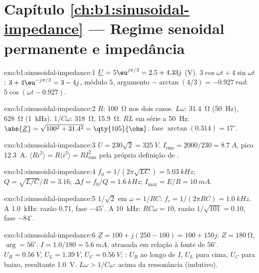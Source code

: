 \section*{Capítulo \ref{ch:b1:sinusoidal-impedance} --- Regime senoidal permanente e impedância}

\begin{solution}{exo:b1:sinusoidal-impedance:1}
$\underline U = 5\eu^{j\pi/3} = 2.5 + 4.33j$ (V). $3\cos\omega t +
4\sin\omega t$: $3 + 4\eu^{-j\pi/2} = 3 - 4j$, módulo $5$, argumento
$-\arctan(4/3) = \qty{-0.927}{rad}$: $5\cos(\omega t - 0.927)$.
\end{solution}

\begin{solution}{exo:b1:sinusoidal-impedance:2}
$R$: \qty{100}{\ohm} nos dois casos. $L\omega$: \qty{31.4}{\ohm} (\qty{50}{Hz}),
\qty{628}{\ohm} (\qty{1}{kHz}). $1/C\omega$: \qty{318}{\ohm}, \qty{15.9}{\ohm}.
$RL$ em série a \qty{50}{Hz}: $\abs{\underline Z} = \sqrt{100^2 + 31.4^2} =
\qty{105}{\ohm}$, fase $\arctan(0.314) = 17^\circ$.
\end{solution}

\begin{solution}{exo:b1:sinusoidal-impedance:3}
$U = 230\sqrt2 = \qty{325}{V}$. $I_{\mathrm{rms}} = 2000/230 = \qty{8.7}{A}$,
pico \qty{12.3}{A}. $\langle Ri^2\rangle = R\langle i^2\rangle =
RI_{\mathrm{rms}}^2$ pela própria definição de .
\end{solution}

\begin{solution}{exo:b1:sinusoidal-impedance:4}
$f_0 = 1/(2\pi\sqrt{LC}) = \qty{5.03}{kHz}$; $Q = \sqrt{L/C}/R = 3.16$;
$\Delta f = f_0/Q = \qty{1.6}{kHz}$; $I_{\max} = E/R = \qty{10}{mA}$.
\end{solution}

\begin{solution}{exo:b1:sinusoidal-impedance:5}
$1/\sqrt2$ em $\omega = 1/RC$: $f_c = 1/(2\pi RC) = \qty{1.0}{kHz}$. A
\qty{1.0}{kHz}: razão $0.71$, fase $-45^\circ$. A \qty{10}{kHz}:
$RC\omega = 10$, razão $1/\sqrt{101} = 0.10$, fase $-84^\circ$.
\end{solution}

\begin{solution}{exo:b1:sinusoidal-impedance:6}
$\underline Z = 100 + j(250 - 100) = 100 + 150j$: $Z = \qty{180}{\ohm}$,
$\arg = 56^\circ$. $I = 1.0/180 = \qty{5.6}{mA}$, atrasada em relação à fonte de
$56^\circ$. $U_R = \qty{0.56}{V}$, $U_L = \qty{1.39}{V}$, $U_C = \qty{0.56}{V}$;
: $U_R$ ao longo de $I$, $U_L$ para cima, $U_C$ para baixo, resultante \qty{1.0}{V}.
$L\omega > 1/C\omega$: acima da ressonância (indutivo).
\end{solution}

